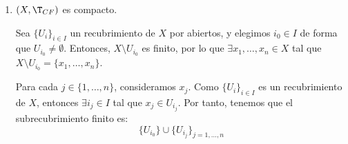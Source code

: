 \begin{ejemplo}
\begin{enumerate}
        \item $(X,\T_{CF})$ es compacto.
        
        Sea $\{U_i\}_{i\in I}$ un recubrimiento de $X$ por abiertos, y elegimos $i_0\in I$ de forma que $U_{i_0}\neq \emptyset$.
        Entonces, $X\setminus U_{i_0}$ es finito, por lo que $\exists x_1,\dots,x_n\in X$ tal que $X\setminus U_{i_0}=\{x_1,\dots,x_n\}$.

        Para cada $j\in \{1,\dots,n\}$, consideramos $x_j$. Como $\{U_i\}_{i\in I}$ es un recubrimiento de $X$, entonces $\exists i_j\in I$ tal que $x_j\in U_{i_j}$.
        Por tanto, tenemos que el subrecubrimiento finito es:
        \begin{equation*}
            \{U_{i_0}\} \cup \{U_{i_j}\}_{j=1,\dots,n}
        \end{equation*}
    \end{enumerate}
\end{ejemplo}

